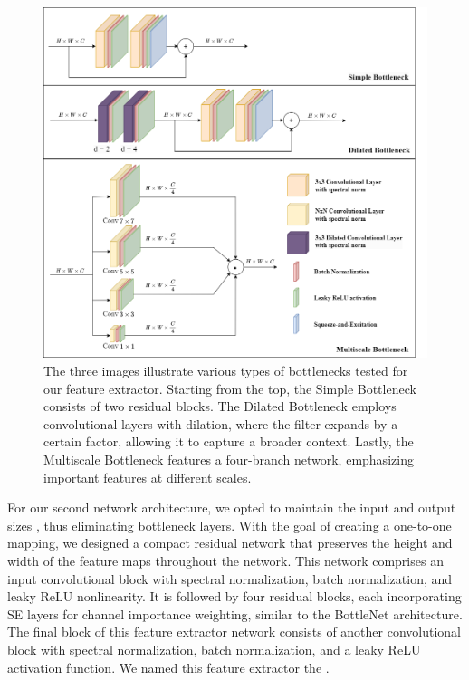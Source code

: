 \begin{figure}[htbp]
    \centering
    \includegraphics[width=0.9\linewidth]{images/methods_mono/bottleneck/bottleneck.png}
    \captionsetup{justification=justified, singlelinecheck=false, width=1\linewidth, labelfont=bf} 
    \caption[]{The three images illustrate various types of bottlenecks tested for our feature extractor. Starting from the top, the Simple Bottleneck consists of two residual blocks. The Dilated Bottleneck employs convolutional layers with dilation, where the filter expands by a certain factor, allowing it to capture a broader context. Lastly, the Multiscale Bottleneck features a four-branch network, emphasizing important features at different scales.}
    \label{fig:Bottlenecks}
\end{figure}


\noindent For our second network architecture, we opted to maintain the input and output sizes , thus eliminating bottleneck layers. With the goal of creating a one-to-one mapping, we designed a compact residual network that preserves the height and width of the feature maps throughout the network. This network comprises an input convolutional block with spectral normalization, batch normalization, and leaky ReLU nonlinearity. It is followed by four residual blocks, each incorporating SE layers for channel importance weighting, similar to the BottleNet architecture. The final block of this feature extractor network consists of another convolutional block with spectral normalization, batch normalization, and a leaky ReLU activation function. We named this feature extractor the .

